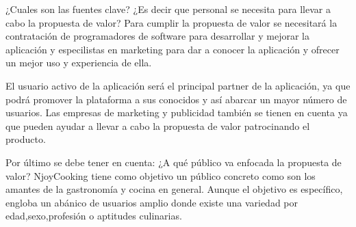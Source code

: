 \vspace{5 mm}

¿Cuales son las fuentes clave? ¿Es decir que personal se necesita para llevar a cabo la propuesta de valor? Para cumplir la propuesta de valor se necesitará la contratación de programadores de software para desarrollar y mejorar la aplicación y especilistas en marketing para dar a conocer la aplicación y ofrecer un mejor uso y experiencia de ella.

\vspace{5 mm}

El usuario activo de la aplicación será el principal partner de la aplicación, ya que podrá promover la plataforma a sus conocidos y así abarcar un mayor número de usuarios. Las empresas de marketing y publicidad también se tienen en cuenta ya que pueden ayudar a llevar a cabo la propuesta de valor patrocinando el producto.


\vspace{5 mm}

Por último se debe tener en cuenta: ¿A qué público va enfocada la propuesta de valor? NjoyCooking tiene como objetivo un público concreto como son los amantes de la gastronomía y cocina en general. Aunque el objetivo es específico, engloba un abánico de usuarios amplio donde existe una variedad por edad,sexo,profesión o aptitudes culinarias.



